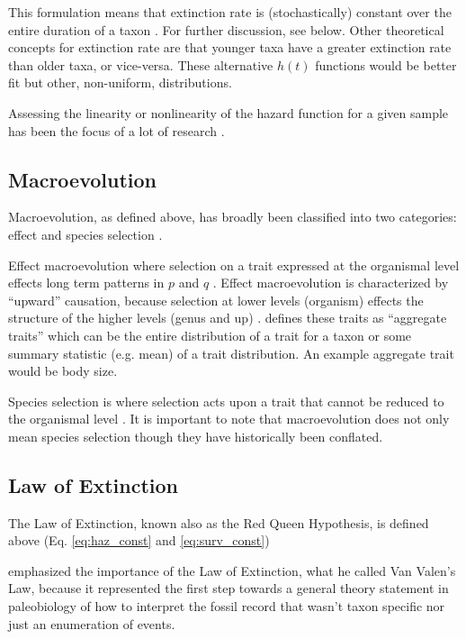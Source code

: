 \documentclass[12pt,letterpaper]{article}
\begin{document}
This formulation means that extinction rate is (stochastically) constant over the entire duration of a taxon \citep{VanValen1973}. For further discussion, see below. Other theoretical concepts for extinction rate are that younger taxa have a greater extinction rate than older taxa, or vice-versa. These alternative \(h(t)\) functions would be better fit but other, non-uniform, distributions.

Assessing the linearity or nonlinearity of the hazard function for a given sample has been the focus of a lot of research \citep{Raup1975,Raup1978,Kitchell1991}.

\subsection{Macroevolution}
Macroevolution, as defined above, has broadly been classified into two categories: effect and species selection \citep{Jablonski2008a}. 

Effect macroevolution where selection on a trait expressed at the organismal level effects long term patterns in \(p\) and \(q\) \citep{Vrba1983,Jablonski2008a}. Effect macroevolution is characterized by ``upward'' causation, because selection at lower levels (organism) effects the structure of the higher levels (genus and up) \citep{Jablonski2008a}. \citet{Jablonski2008a} defines these traits as ``aggregate traits'' which can be the entire distribution of a trait for a taxon or some summary statistic (e.g. mean) of a trait distribution. An example aggregate trait would be body size. %

Species selection is where selection acts upon a trait that cannot be reduced to the organismal level \citep{Jablonski2007,Jablonski2008a}.
It is important to note that macroevolution does not only mean species selection \citep{Vrba1983} though they have historically been conflated.

\subsection{Law of Extinction}
The Law of Extinction, known also as the Red Queen Hypothesis, is defined above (Eq. \ref{eq:haz_const} and \ref{eq:surv_const})

\citet{Raup1975} emphasized the importance of the Law of Extinction, what he called Van Valen's Law, because it represented the first step towards a general theory statement in paleobiology of how to interpret the fossil record that wasn't taxon specific nor just an enumeration of events.
\end{document}
